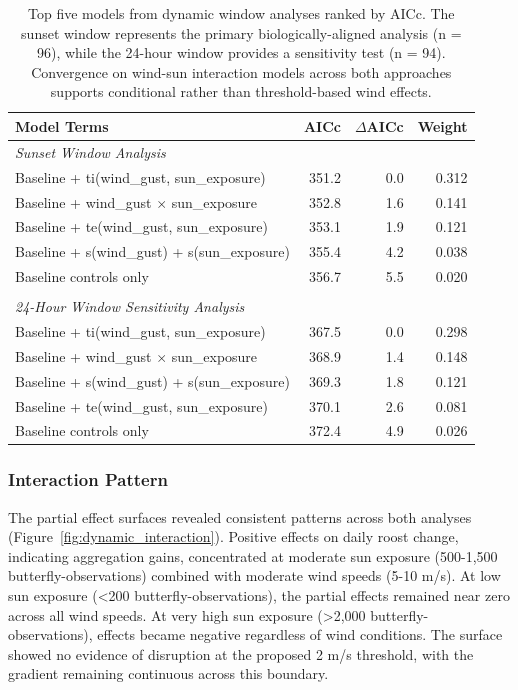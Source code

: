 \begin{table}[htbp]
\centering
\caption{Top five models from dynamic window analyses ranked by AICc. The sunset window represents the primary biologically-aligned analysis (n = 96), while the 24-hour window provides a sensitivity test (n = 94). Convergence on wind-sun interaction models across both approaches supports conditional rather than threshold-based wind effects.}
\label{tab:dynamic_model_selection}
\begin{tabular}{lrrr}
\hline
Model Terms & AICc & $\Delta$AICc & Weight \\
\hline
\multicolumn{4}{l}{\textit{Sunset Window Analysis}} \\
Baseline + ti(wind\_gust, sun\_exposure) & 351.2 & 0.0 & 0.312 \\
Baseline + wind\_gust $\times$ sun\_exposure & 352.8 & 1.6 & 0.141 \\
Baseline + te(wind\_gust, sun\_exposure) & 353.1 & 1.9 & 0.121 \\
Baseline + s(wind\_gust) + s(sun\_exposure) & 355.4 & 4.2 & 0.038 \\
Baseline controls only & 356.7 & 5.5 & 0.020 \\
\\
\multicolumn{4}{l}{\textit{24-Hour Window Sensitivity Analysis}} \\
Baseline + ti(wind\_gust, sun\_exposure) & 367.5 & 0.0 & 0.298 \\
Baseline + wind\_gust $\times$ sun\_exposure & 368.9 & 1.4 & 0.148 \\
Baseline + s(wind\_gust) + s(sun\_exposure) & 369.3 & 1.8 & 0.121 \\
Baseline + te(wind\_gust, sun\_exposure) & 370.1 & 2.6 & 0.081 \\
Baseline controls only & 372.4 & 4.9 & 0.026 \\
\hline
\end{tabular}
\end{table}

\subsubsection{Interaction Pattern}

The partial effect surfaces revealed consistent patterns across both analyses (Figure~\ref{fig:dynamic_interaction}). Positive effects on daily roost change, indicating aggregation gains, concentrated at moderate sun exposure (500-1,500 butterfly-observations) combined with moderate wind speeds (5-10 m/s). At low sun exposure (<200 butterfly-observations), the partial effects remained near zero across all wind speeds. At very high sun exposure (>2,000 butterfly-observations), effects became negative regardless of wind conditions. The surface showed no evidence of disruption at the proposed 2 m/s threshold, with the gradient remaining continuous across this boundary.

